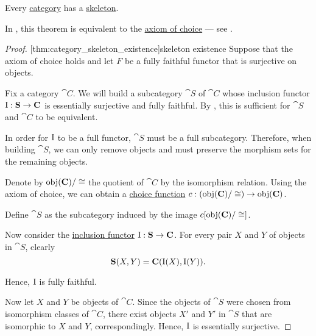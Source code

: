 \begin{theorem}\label{thm:category_skeleton_existence}
  Every \hyperref[def:category]{category} has a \hyperref[def:skeletal_category]{skeleton}.

  In \hyperref[def:zfc]{}, this theorem is equivalent to the \hyperref[def:zfc/choice]{axiom of choice} --- see .
\end{theorem}
\begin{proof}
  [thm:category_skeleton_existence]{skeleton existence} Suppose that the axiom of choice holds and let \( F \) be a fully faithful functor that is surjective on objects.

  Fix a category \( \cat{C} \). We will build a subcategory \( \cat{S} \) of \( \cat{C} \) whose inclusion functor \( \operatorname{I}: \operatorname{\mathbf{S}} \to \operatorname{\mathbf{C}} \) is essentially surjective and fully faithful. By , this is sufficient for \( \cat{S} \) and \( \cat{C} \) to be equivalent.

  In order for \( \operatorname{I} \) to be a full functor, \( \cat{S} \) must be a full subcategory. Therefore, when building \( \cat{S} \), we can only remove objects and must preserve the morphism sets for the remaining objects.

  Denote by \( \operatorname{obj}(\operatorname{\mathbf{C}}) / \cong \) the quotient of \( \cat{C} \) by the isomorphism relation. Using the axiom of choice, we can obtain a \hyperref[def:choice_function]{choice function} \( c: (\operatorname{obj}(\operatorname{\mathbf{C}}) / \cong) \to \operatorname{obj}(\operatorname{\mathbf{C}}) \).

  Define \( \cat{S} \) as the subcategory induced by the image \( c[\operatorname{obj}(\operatorname{\mathbf{C}}) / \cong] \).

  Now consider the \hyperref[def:subcategory]{inclusion functor} \( \operatorname{I}: \operatorname{\mathbf{S}} \to \operatorname{\mathbf{C}} \). For every pair \( X \) and \( Y \) of objects in \( \cat{S} \), clearly
  \begin{equation*}
    \operatorname{\mathbf{S}}(X, Y) = \operatorname{\mathbf{C}}(\operatorname{I}(X), \operatorname{I}(Y)).
  \end{equation*}

  Hence, \( \operatorname{I} \) is fully faithful.

  Now let \( X \) and \( Y \) be objects of \( \cat{C} \). Since the objects of \( \cat{S} \) were chosen from isomorphism classes of \( \cat{C} \), there exist objects \( X' \) and \( Y' \) in \( \cat{S} \) that are isomorphic to \( X \) and \( Y \), correspondingly. Hence, \( \operatorname{I} \) is essentially surjective.


\end{proof}
